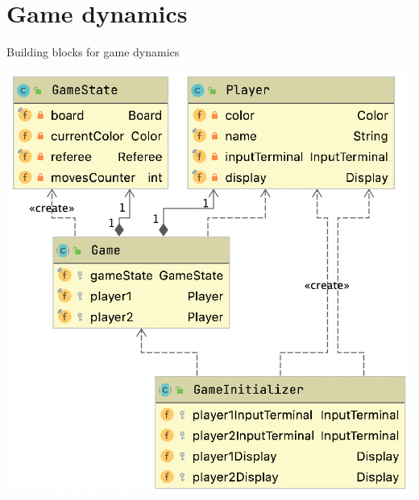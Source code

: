 \documentclass{beamer}
\begin{document}
\section{Game dynamics}


\begin{frame}{Building blocks for game dynamics}
   \begin{center}
       \includegraphics[scale=0.45]{images/game_uml.png}
      \end{center}

\end{frame}
\end{document}
